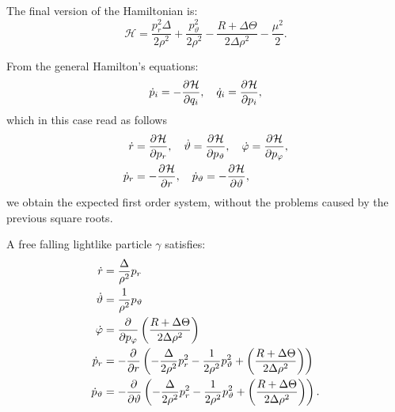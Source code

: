 The final version of the Hamiltonian is:
\begin{equation}
\mathcal{H} = \frac{p_r^2 \Delta}{2\rho^2} + \frac{p_\vartheta^2}{2\rho^2} - \frac{R + \Delta \Theta}{2\Delta\rho^2} - \frac{\mu^2}{2}.
\end{equation}

From the general Hamilton's equations:
\[
\dot{p}_i = -\frac{\partial^{} \mathcal{H}}{\partial q_i}, \quad \dot{q}_i = \frac{\partial^{} \mathcal{H}}{\partial p_i},
\]
which in this case read as follows
\begin{align*}
\dot{r} &= \frac{\partial^{} \mathcal{H}}{\partial p_r}, \quad \dot{\vartheta} = \frac{\partial^{} \mathcal{H}}{\partial p_\vartheta}, \quad \dot{\varphi} = \frac{\partial^{} \mathcal{H}}{\partial p_\varphi}, \\
\dot{p}_r &= - \frac{\partial^{} \mathcal{H}}{\partial r}, \quad \dot{p}_\vartheta = - \frac{\partial^{} \mathcal{H}}{\partial \vartheta},
\end{align*}
we obtain the expected first order system, without the problems caused by the previous square roots.

\begin{theorem}
	\label{theo:eqsmotion}
	A free falling lightlike particle $\gamma$ satisfies:
	\begin{align}
	\dot{r} &= \frac{\Delta}{\rho^2} p_r \\
	\dot{\vartheta} &= \frac{1}{\rho^2}p_\vartheta \\ \label{eq:eqsmotionp}
	\dot{\varphi} &= \frac{\partial^{} }{\partial p_\varphi}\left( \frac{R + \Delta\Theta}{2\Delta\rho^2} \right) \\ \label{eq:eqsmotionpr}
	\dot{p}_r &= - \frac{\partial^{} }{\partial r} \left( - \frac{\Delta}{2\rho^2}p_r^2 - \frac{1}{2\rho^2}p_\vartheta^2 + \left( \frac{R + \Delta\Theta}{2\Delta\rho^2} \right) \right) \\ \label{eq:eqsmotionpt}
	\dot{p}_\vartheta &= - \frac{\partial^{} }{\partial \vartheta} \left( - \frac{\Delta}{2\rho^2}p_r^2 - \frac{1}{2\rho^2}p_\vartheta^2 + \left( \frac{R + \Delta\Theta}{2\Delta\rho^2} \right) \right).
	\end{align}
\end{theorem}